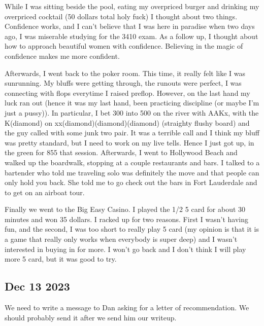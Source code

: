 \documentclass[12pt]{article}
\begin{document}
\hfill

While I was sitting beside the pool, eating my overpriced burger and drinking my overpriced cocktail (50 dollars total holy fuck)
I thought about two things. Confidence works, and I can't believe that I was here in paradise when
two days ago, I was miserable studying for the 3410 exam. As a follow up, I thought about how to approach beautiful women with confidence. Believing in 
the magic of confidence makes me more confident.

\hfill 

Afterwards, I went back to the poker room. This time, it really felt like I was sunrunning.
My bluffs were getting through, the runouts were perfect, I was connecting with flops everytime I raised preflop. 
However, on the last hand my luck ran out (hence it was my last hand, been practicing discipline (or maybe I'm just a pussy)).
In particular, I bet 300 into 500 on the river with AAKx, with the K(diamond) on xx(diamond)(diamond)(diamond) (straighty flushy board)
and the guy called with some junk two pair. It was a terrible call and I think my bluff was pretty standard,
but I need to work on my live tells. Hence I just got up, in the green for 855 that session. Afterwards, I went to Hollywood Beach
and walked up the boardwalk, stopping at a couple restaurants and bars. I talked to a bartender who
told me traveling solo was definitely the move and that people can only hold you back. She told me
to go check out the bars in Fort Lauderdale and to get on an airboat tour.

\hfill

Finally we went to the Big Easy Casino. I played the 1/2 5 card for about 30 minutes and won 35 dollars.
I racked up for two reasons. First I wasn't having fun, and the second, I was too short to really play 5 card
(my opinion is that it is a game that really only works when everybody is super deep) and I wasn't interested in
buying in for more. I won't go back and I don't think I will play more 5 card, but it was good to try.
\subsection{Dec 13 2023}
We need to write a message to Dan asking for a letter of recommendation. 
We should probably send it after we send him our writeup.
\end{document}
